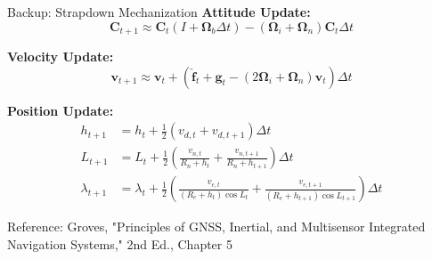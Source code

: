\documentclass[aspectratio=169]{beamer}
\begin{document}
\begin{frame}{Backup: Strapdown Mechanization}
\textbf{Attitude Update:}
\begin{equation*}
\mathbf{C}_{t+1} \approx \mathbf{C}_t \left( I + \boldsymbol{\Omega}_{b} \Delta t \right) - \left( \boldsymbol{\Omega}_{i} + \boldsymbol{\Omega}_{n} \right) \mathbf{C}_t \Delta t
\end{equation*}

\textbf{Velocity Update:}
\begin{equation*}
\mathbf{v}_{t+1} \approx \mathbf{v}_{t} + \left( \hat{\mathbf{f}}_{t} + \mathbf{g}_t - \left( 2\boldsymbol{\Omega}_{i} + \boldsymbol{\Omega}_{n} \right) \mathbf{v}_t \right) \Delta t
\end{equation*}

\textbf{Position Update:}
\begin{align*}
h_{t+1} &= h_{t} + \frac{1}{2} \left( v_{d, t} + v_{d, t+1} \right) \Delta t \\
L_{t+1} &= L_{t} + \frac{1}{2} \left( \frac{v_{n, t}}{R_n + h_t} + \frac{v_{n, t+1}}{R_n + h_{t+1}} \right) \Delta t \\
\lambda_{t+1} &= \lambda_{t} + \frac{1}{2} \left( \frac{v_{e, t}}{(R_e + h_t) \cos L_t} + \frac{v_{e, t+1}}{(R_e + h_{t+1}) \cos L_{t+1}} \right) \Delta t
\end{align*}

\vspace{0.5em}
\small
Reference: Groves, "Principles of GNSS, Inertial, and Multisensor Integrated Navigation Systems," 2nd Ed., Chapter 5
\end{frame}
\end{document}
